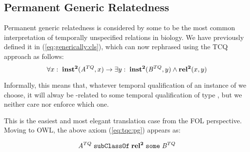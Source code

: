 
\subsection*{Permanent Generic Relatedness}
Permanent generic relatedness is considered by some to be the most common
interpretation of temporally unspecified relations in biology. We have
previously defined it in (\ref{eq:generically:cls}), which can
now rephrased using the TCQ approach as follows:
\begin{equation}
\forall x:\; \mathrm{\mathbf{inst^2}}(\mathit{A}^{TQ},x) \rightarrow \exists y :\;
\mathrm{\mathbf{inst^2}}(\mathit{B}^{TQ}, y) \wedge \mathrm{\mathbf{rel^2}}(x,y)
\label{eq:tqc:pg}
\end{equation}

Informally, this means that, whatever temporal qualification of an instance of
 we choose, it will alway be -related to some temporal
qualification of type , but we neither care nor enforce which one.

This is the easiest and most elegant translation case from the FOL perspective.
Moving to OWL, the above axiom (\ref{eq:tqc:pg}) appears as:

\begin{equation}
\mathit{A}^{TQ}\;\mathtt{subClassOf}\;\mathrm{\mathbf{rel^2}}\;\mathtt{some}\;\mathit{B}^{TQ}
\label{eq:tqc:pg:owl}
\end{equation}



